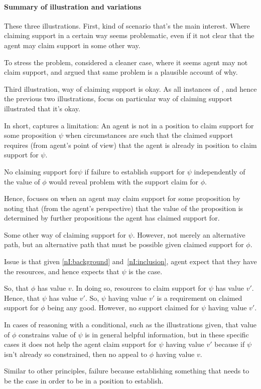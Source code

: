 \paragraph{Summary of illustration and variations}

\begin{note}
  These three illustrations.
  First, kind of scenario that's the main interest.
  Where claiming support in a certain way seems problematic, even if it not clear that the agent may claim support in some other way.

  To stress the problem, considered a cleaner case, where it seems agent may not claim support, and argued that same problem is a plausible account of why.

  Third illustration, way of claiming support is okay.
  As all instances of \nI{}, and hence the previous two illustrations, focus on particular way of claiming support illustrated that it's okay.
\end{note}

\begin{note}[Intuition]
  In short, \nI{} captures a limitation: An agent is not in a position to claim support for some proposition \(\psi\) when circumstances are such that the claimed support requires (from agent's point of view) that the agent is already in position to claim support for \(\psi\).

  No claiming support for\(\psi\) if failure to establish support for \(\psi\) independently of the value of \(\phi\) would reveal problem with the support claim for \(\phi\).

  Hence, \nI{} focuses on when an agent may claim support for some proposition by noting that (from the agent's perspective) that the value of the proposition is determined by further propositions the agent has claimed support for.

  Some other way of claiming support for \(\psi\).
  However, not merely an alternative path, but an alternative path that must be possible given claimed support for \(\phi\).

  Issue is that given \ref{nI:background} and~\ref{nI:inclusion}, agent expect that they have the resources, and hence expects that \(\psi\) is the case.

  So, that \(\phi\) has value \(v\).
  In doing so, resources to claim support for \(\psi\) has value \(v'\).
  Hence, that \(\psi\) has value \(v'\).
  So, \(\psi\) having value \(v'\) is a requirement on claimed support for \(\phi\) being any good.
  However, no support claimed for \(\psi\) having value \(v'\).

  In cases of reasoning with a conditional, such as the illustrations given, that value of \(\phi\) constrains value of \(\psi\) is in general helpful information, but in these specific cases it does not help the agent claim support for \(\psi\) having value \(v'\) because if \(\psi\) isn't already so constrained, then no appeal to \(\phi\) having value \(v\).

  Similar to other principles, failure because establishing something that needs to be the case in order to be in a position to establish.
\end{note}

